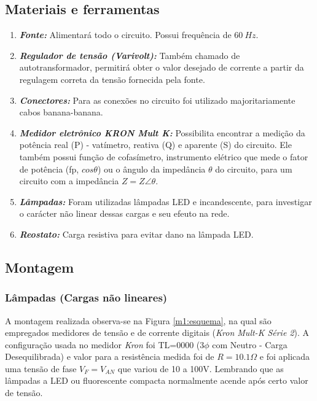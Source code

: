 \documentclass[a4paper,12pt,oneside,openany,table,xcdraw]{article}
\begin{document}
\subsection{Materiais e ferramentas} %
\begin{enumerate}[1 -]
\item \emph{\textbf{Fonte:}}
Alimentará todo o circuito. Possui frequência de $60\ Hz$.

\item \emph{\textbf{Regulador de tensão (Varivolt):}}
Também chamado de autotransformador, permitirá obter o valor desejado de corrente a partir da regulagem correta da tensão fornecida pela fonte.

\item \emph{\textbf{Conectores:}}
Para as conexões no circuito foi utilizado majoritariamente cabos banana-banana.

\item \emph{\textbf{Medidor eletrônico KRON Mult K:}}
Possibilita encontrar a medição da potência real (P) - vatímetro, reativa (Q) e aparente (S) do circuito. Ele também possui função de cofasímetro, instrumento elétrico que mede o fator de potência (fp, $cos\theta$) ou o ângulo da impedância $\theta$ do circuito, para um circuito com a impedância $Z = Z\angle \theta$.

\item \emph{\textbf{Lâmpadas:}}
Foram utilizadas lâmpadas LED e incandescente, para investigar o carácter não linear dessas cargas e seu efeuto na rede.

\item \emph{\textbf{Reostato:}}
Carga resistiva para evitar dano na lâmpada LED.


\end{enumerate}

\vspace{0.2cm}
\subsection{Montagem} %

\subsubsection{Lâmpadas (Cargas não lineares)}
A montagem realizada observa-se na Figura \ref{m1:esquema}, na qual são empregados medidores de tensão e de corrente digitais (\emph{Kron Mult-K Série 2}). A configuração usada no medidor \emph{Kron} foi TL=0000 ($3\phi$ com Neutro - Carga Desequilibrada) e valor para a resistência medida foi de $R=10.1\Omega$ e foi aplicada uma tensão de fase $V_F=V_{AN}$ que variou de 10 a 100V. Lembrando que as lâmpadas a LED ou fluorescente compacta normalmente acende após certo valor de tensão.
\end{document}
